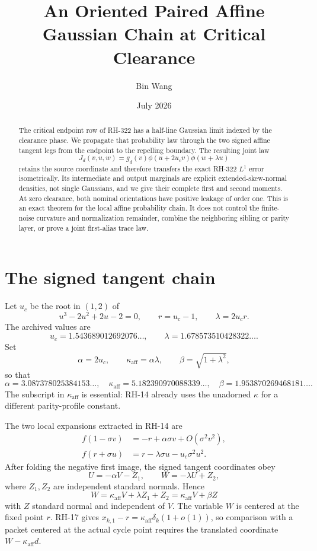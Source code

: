 \documentclass[11pt]{article}
\title{An Oriented Paired Affine Gaussian Chain at Critical Clearance}
\author{Bin Wang}
\date{July 2026}
\theoremstyle{remark}
\newcommand{\ka}{\kappa_{\mathrm{aff}}}
\begin{document}
\maketitle

\begin{abstract}
The critical endpoint row of RH-322 has a half-line Gaussian limit indexed by
the clearance phase.  We propagate that probability law through the two
signed affine tangent legs from the endpoint to the repelling boundary.  The
resulting joint law
\[
 J_d(v,u,w)=g_d(v)\phi(u+2u_cv)\phi(w+\lambda u)
\]
retains the source coordinate and therefore transfers the exact RH-322
$L^1$ error isometrically.  Its intermediate and output marginals are
explicit extended-skew-normal densities, not single Gaussians, and we give
their complete first and second moments.  At zero clearance, both nominal
orientations have positive leakage of order one.  This is an exact theorem
for the local affine probability chain.  It does not control the finite-noise
curvature and normalization remainder, combine the neighboring sibling or
parity layer, or prove a joint first-alias trace law.
\end{abstract}

\section{The signed tangent chain}

Let $u_c$ be the root in $(1,2)$ of
\[
 u^3-2u^2+2u-2=0,
 \qquad r=u_c-1,
 \qquad \lambda=2u_cr.
\]
The archived values are
\[
 u_c=1.543689012692076\ldots,
 \qquad \lambda=1.678573510428322\ldots.
\]
Set
\begin{equation}\label{eq:constants}
 \alpha=2u_c,
 \qquad \ka=\alpha\lambda,
 \qquad \beta=\sqrt{1+\lambda^2},
\end{equation}
so that
\[
 \alpha=3.087378025384153\ldots,
 \quad \ka=5.182390970088339\ldots,
 \quad \beta=1.953870269468181\ldots.
\]
The subscript in $\ka$ is essential: RH-14 already uses the unadorned
$\kappa$ for a different parity-profile constant.

The two local expansions extracted in RH-14 are
\begin{align}
 f(1-\sigma v)
  &=-r+\alpha\sigma v+O(\sigma^2v^2),
  \label{eq:endpoint-expansion}\\
 f(r+\sigma u)
  &=r-\lambda\sigma u-u_c\sigma^2u^2.
  \label{eq:repelling-expansion}
\end{align}
After folding the negative first image, the signed tangent coordinates obey
\begin{equation}\label{eq:oriented-chain}
 U=-\alpha V-Z_1,
 \qquad W=-\lambda U+Z_2,
\end{equation}
where $Z_1,Z_2$ are independent standard normals.  Hence
\begin{equation}\label{eq:collapsed-chain}
 W=\ka V+\lambda Z_1+Z_2
   =\ka V+\beta Z
\end{equation}
with $Z$ standard normal and independent of $V$.  The variable $W$ is
centered at the fixed point $r$.  RH-17 gives
$x_{k,1}-r=\ka\delta_k(1+o(1))$, so comparison with a packet centered at the
actual cycle point requires the translated coordinate $W-\ka d$.
\end{document}
